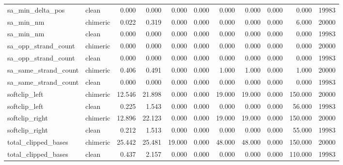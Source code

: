 \begin{landscape}
\begin{center}
\begin{longtable}{llrrrrrrrrr}
sa\_min\_delta\_pos & clean & 0.000 & 0.000 & 0.000 & 0.000 & 0.000 & 0.000 & 0.000 & 0.000 & 19983 \\
sa\_min\_nm & chimeric & 0.022 & 0.319 & 0.000 & 0.000 & 0.000 & 0.000 & 0.000 & 6.000 & 20000 \\
sa\_min\_nm & clean & 0.000 & 0.000 & 0.000 & 0.000 & 0.000 & 0.000 & 0.000 & 0.000 & 19983 \\
sa\_opp\_strand\_count & chimeric & 0.000 & 0.000 & 0.000 & 0.000 & 0.000 & 0.000 & 0.000 & 0.000 & 20000 \\
sa\_opp\_strand\_count & clean & 0.000 & 0.000 & 0.000 & 0.000 & 0.000 & 0.000 & 0.000 & 0.000 & 19983 \\
sa\_same\_strand\_count & chimeric & 0.406 & 0.491 & 0.000 & 0.000 & 1.000 & 1.000 & 0.000 & 1.000 & 20000 \\
sa\_same\_strand\_count & clean & 0.000 & 0.000 & 0.000 & 0.000 & 0.000 & 0.000 & 0.000 & 0.000 & 19983 \\
softclip\_left & chimeric & 12.546 & 21.898 & 0.000 & 0.000 & 19.000 & 19.000 & 0.000 & 150.000 & 20000 \\
softclip\_left & clean & 0.225 & 1.543 & 0.000 & 0.000 & 0.000 & 0.000 & 0.000 & 56.000 & 19983 \\
softclip\_right & chimeric & 12.896 & 22.123 & 0.000 & 0.000 & 19.000 & 19.000 & 0.000 & 150.000 & 20000 \\
softclip\_right & clean & 0.212 & 1.513 & 0.000 & 0.000 & 0.000 & 0.000 & 0.000 & 55.000 & 19983 \\
total\_clipped\_bases & chimeric & 25.442 & 25.481 & 19.000 & 0.000 & 48.000 & 48.000 & 0.000 & 150.000 & 20000 \\
total\_clipped\_bases & clean & 0.437 & 2.157 & 0.000 & 0.000 & 0.000 & 0.000 & 0.000 & 110.000 & 19983 \\

\end{longtable}
\end{center}
\end{landscape}
